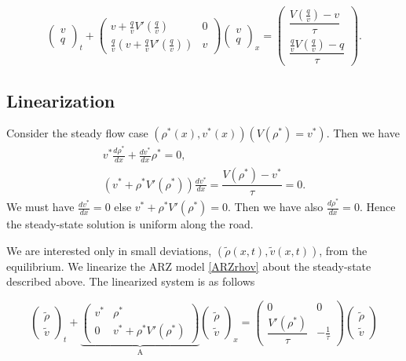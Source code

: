 \documentclass[review]{elsarticle}
\begin{document}
\begin{equation} \label{ARZvq}
\begin{pmatrix}
v \\ q
\end{pmatrix}_t
+ \begin{pmatrix}
v + \frac{q}{v} V'\left(\frac{q}{v}\right) & 0 \\
\frac{q}{v} \left( v + \frac{q}{v} V'\left(\frac{q}{v}\right)\right) & v
\end{pmatrix}
\begin{pmatrix}
v \\ q
\end{pmatrix}_x = 
\begin{pmatrix}
\dfrac{V\left( \frac{q}{v}\right) - v}{\tau} \\ 
\dfrac{\frac{q}{v}V\left( \frac{q}{v}\right) - q}{\tau}
\end{pmatrix}.
\end{equation}


\subsection{Linearization}
Consider the steady flow case $(\rho^*(x),v^*(x))(V(\rho^*) = v^*)$. Then we have
\begin{align}
v^* \frac{d\rho^*}{dx} + \frac{dv^*}{dx}\rho^* = 0, \\
\left( v^* + \rho^* V'( \rho^*) \right)\frac{dv^*}{dx} = \dfrac{V(\rho^*) - v^*}{\tau} = 0.
\end{align}
We must have $\frac{dv^*}{dx}=0$ else $v^* + \rho^* V'( \rho^*) = 0$. Then we have also $\frac{d\rho^*}{dx} = 0$. Hence the steady-state solution is uniform along the road.

We are interested only in small deviations, $(\tilde{\rho}(x,t), \tilde{v}(x,t))$, from the equilibrium. We linearize the ARZ model \eqref{ARZrhov} about the steady-state described above. The linearized system is as follows 

\begin{equation} \label{rhovlin}
\begin{pmatrix}
\tilde{\rho} \\ \tilde{v}
\end{pmatrix}_t
+ \underbrace{\begin{pmatrix}
v^* & \rho^* \\
0 & v^* + \rho^* V' ( \rho^*) 
\end{pmatrix}}_\text{A}
\begin{pmatrix}
\tilde{\rho} \\ \tilde{v}
\end{pmatrix}_x = 
\begin{pmatrix}
0 & 0 \\
\dfrac{V' (\rho^*)}{\tau} & -\frac{1}{\tau}
\end{pmatrix}
\begin{pmatrix}
\tilde{\rho} \\ \tilde{v}
\end{pmatrix}
\end{equation}
\end{document}
